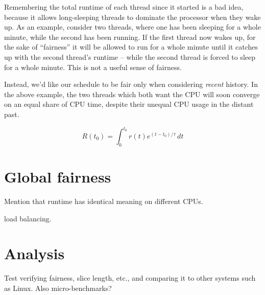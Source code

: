 \documentclass{sig-alternate}
\begin{document}
Remembering the total runtime of each thread since it started
is a bad idea, because it allows long-sleeping threads to dominate the
processor when they wake up. As an example, consider two threads,
where one has been sleeping for a whole minute, while the second has been
running. If the first thread now wakes up, for the sake of ``fairness''
it will be allowed to run for a whole minute until it catches up with the
second thread's runtime -- while the second thread is forced to sleep for
a whole minute. This is not a useful sense of fairness.

Instead, we'd like our schedule to be fair only when considering \emph{recent}
history. In the above example, the two threads which both want the CPU will
soon converge on an equal share of CPU time, despite their unequal CPU usage
in the distant past.

\begin{equation}
R(t_0) = \int^{t_0}_{0}\!r(t)e^{(t-t_0)/\tau}\,dt
\end{equation}
\section{Global fairness}
Mention that runtime has identical meaning on different CPUs.

load balancing.


\section{Analysis}
Test verifying fairness, slice length, etc., and comparing it to other
systems such as Linux. Also micro-benchmarks?




\end{document}
